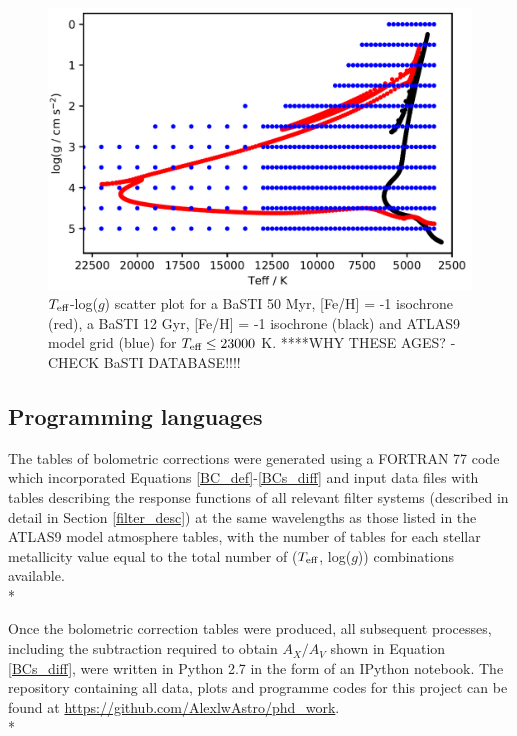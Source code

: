 \documentclass[12pt, a4paper]{report}
\begin{document}
\begin{figure}[h!]
\begin{center}
\includegraphics[width=1.0\textwidth]{ATLAS9_grid_BaSTI_coverage_2ages_crop.png}
\caption{$T_{\textnormal{eff}}$-log($g$) scatter plot for a BaSTI 50 Myr, [Fe/H] = -1 isochrone (red), a BaSTI 12 Gyr, [Fe/H] = -1 isochrone (black) and ATLAS9 model grid (blue) for $T_{\textnormal{eff}} \leq 23000$ K. ****WHY THESE AGES? - CHECK BaSTI DATABASE!!!!}
\label{Teff-logg coverage}
\end{center}
\end{figure}

\subsection{Programming languages}
The tables of bolometric corrections were generated using a FORTRAN 77 code which incorporated Equations \ref{BC_def}-\ref{BCs_diff} and input data files with tables describing the response functions of all relevant filter systems (described in detail in Section \ref{filter_desc}) at the same wavelengths as those listed in the ATLAS9 model atmosphere tables, with the number of tables for each stellar metallicity value equal to the total number of ($T_{\textnormal{eff}}$, log($g$)) combinations available.\\*

Once the bolometric correction tables were produced, all subsequent processes, including the subtraction required to obtain $A_{X}/A_{V}$ shown in Equation \ref{BCs_diff}, were written in Python 2.7 in the form of an IPython notebook. The repository containing all data, plots and programme codes for this project can be found at \protect\url{https://github.com/AlexlwAstro/phd_work}.\\*
\end{document}
